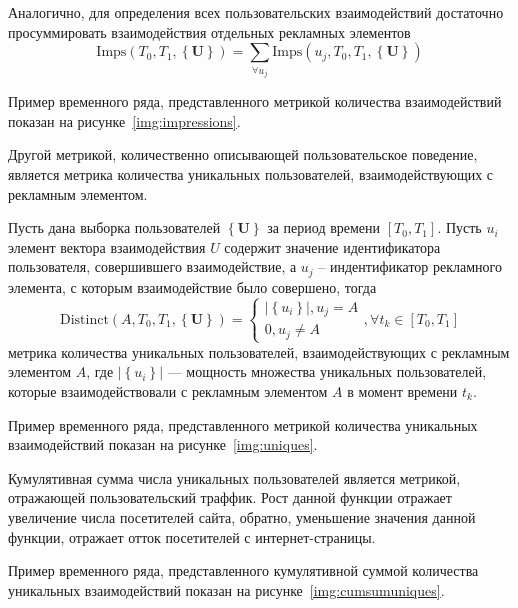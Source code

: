 Аналогично, для определения всех пользовательских взаимодействий достаточно просуммировать взаимодействия отдельных
рекламных элементов
\begin{equation}
    \text{Imps} \left(T_0, T_1, \left\{ \mathbf{U} \right\} \right) =
    \sum \limits_{\forall u_j} \text{Imps} \left(u_j, T_0, T_1, \left\{ \mathbf{U} \right\} \right)
\end{equation}

Пример временного ряда, представленного метрикой количества взаимодействий показан на рисунке~\ref{img:impressions}.


Другой метрикой, количественно описывающей пользовательское поведение, является метрика количества уникальных пользователей,
взаимодействующих с рекламным элементом.

Пусть дана выборка пользователей $\left\{ \mathbf{U} \right\}$ за период времени $\left[T_0, T_1\right]$. Пусть $u_i$
элемент вектора взаимодействия $U$ содержит значение идентификатора пользователя, совершившего взаимодействие, а $u_j$ -- 
индентификатор рекламного элемента, с которым взаимодействие было совершено, тогда
\begin{equation}
    \text{Distinct}\left( A, T_0, T_1, \left\{\mathbf{U}\right\} \right) =
    \begin{cases}
        \left|\left\{u_i\right\}\right|, u_j = A  \\
        0, u_j \neq A
    \end{cases}, \forall t_k \in \left[T_0, T_1\right]
\end{equation}
метрика количества уникальных пользователей, взаимодействующих с рекламным элементом $A$, где 
$\left|\left\{u_i\right\}\right|$ --- мощность множества уникальных пользователей, которые взаимодействовали с рекламным
элементом $A$ в момент времени $t_k$.

Пример временного ряда, представленного метрикой количества уникальных взаимодействий показан на 
рисунке~\ref{img:uniques}.


Кумулятивная сумма числа уникальных пользователей является метрикой, отражающей  пользовательский траффик. Рост данной
функции отражает увеличение числа посетителей сайта, обратно, уменьшение значения данной функции, отражает отток 
посетителей с интернет-страницы.

Пример временного ряда, представленного кумулятивной суммой количества уникальных взаимодействий показан на 
рисунке~\ref{img:cumsumuniques}.
